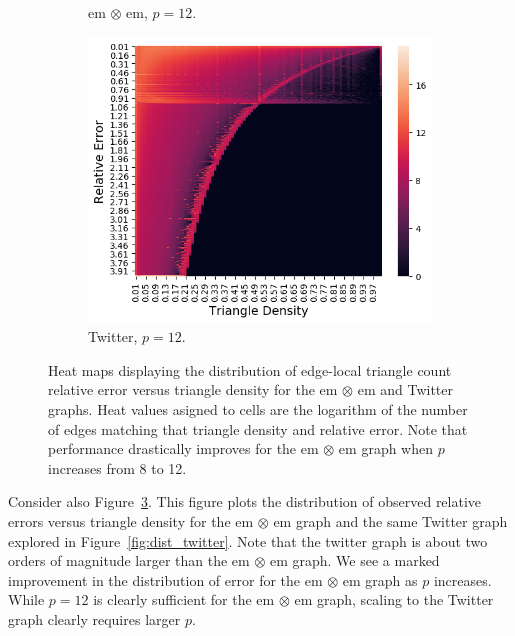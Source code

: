 \documentclass[10]{article}
\begin{document}
\begin{figure}
\begin{center}
\begin{subfigure}{0.32\linewidth}
			\caption{em $\otimes$ em, $p=12$. \label{fig:em_x_em_edge_density_vs_rel_err_p12}}
		\end{subfigure}
		\begin{subfigure}{0.32\linewidth}
			\centerline{\includegraphics[width=1.0\columnwidth]{twitter_edge_dist_p12}}
			\caption{Twitter, $p=12$. \label{fig:twitter_edge_density_vs_rel_err_p12}}
		\end{subfigure}
		\caption{Heat maps displaying the distribution of edge-local triangle count relative error versus triangle density for the em $\otimes$ em and Twitter graphs. 
			Heat values asigned to cells are the logarithm of the number of edges matching that triangle density and relative error.
		 	Note that performance drastically improves for the em $\otimes$ em graph when $p$ increases from 8 to 12.
			\label{fig:edge_density_vs_rel_err}}
	\end{center}
\end{figure}

Consider also Figure~\ref{fig:edge_density_vs_rel_err}. 
This figure plots the distribution of observed relative errors versus triangle density for the em $\otimes$ em graph and the same Twitter graph explored in Figure~\ref{fig:dist_twitter}.
Note that the twitter graph is about two orders of magnitude larger than the em $\otimes$ em graph. 
We see a marked improvement in the distribution of error for the em $\otimes$ em graph as $p$ increases. 
While $p=12$ is clearly sufficient for the em $\otimes$ em graph, scaling to the Twitter graph clearly requires larger $p$.
\end{document}
